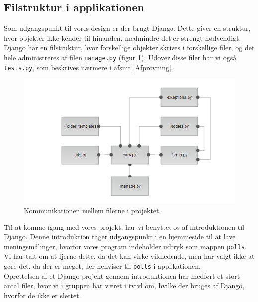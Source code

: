 \documentclass[]{article}
\begin{document}
\subsection{Filstruktur i applikationen}
Som udgangspunkt til vores design er der brugt Django. Dette giver en struktur, hvor objekter ikke kender til hinanden, medmindre det er strengt nødvendigt. Django har en filstruktur, hvor forskellige objekter skrives i forskellige filer, og det hele administreres af filen \texttt{manage.py} (figur \ref{fig:fileStrk}). Udover disse filer har vi også \texttt{tests.py}, som beskrives nærmere i afsnit \ref{Afprovning}.
\begin{figure} [H]
	\centering
	\includegraphics[width = \textwidth]{FileStruct.png}
	\caption[Filstruktur]{Kommunikationen mellem filerne i projektet.}
	\label{fig:fileStrk}
\end{figure}

\noindent Til at komme igang med vores projekt, har vi benyttet os af introduktionen til Django. Denne introduktion tager udgangspunkt i en hjemmeside til at lave meningsmålinger, hvorfor vores program indeholder udtryk som mappen \texttt{polls}. \\
Vi har talt om at fjerne dette, da det kan virke vildledende, men har valgt ikke at gøre det, da der er meget, der henviser til \texttt{polls} i applikationen. \\
Oprettelsen af et Django-projekt gennem introduktionen har medført et stort antal filer, hvor vi i gruppen har været i tvivl om, hvilke der bruges af Django, hvorfor de ikke er slettet.
\end{document}
